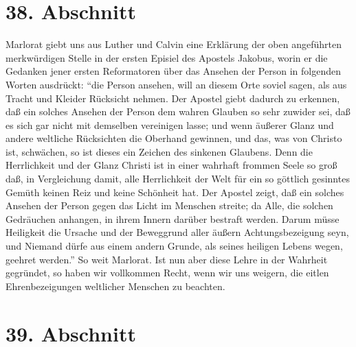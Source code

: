 \section{38. Abschnitt}

Marlorat giebt uns aus Luther und Calvin eine Erklärung der oben angeführten merkwürdigen Stelle in der ersten Episiel des Apostels Jakobus, worin er die Gedanken jener ersten Reformatoren über das Ansehen der Person in folgenden Worten ausdrückt: "`die Person ansehen, will an diesem Orte soviel sagen, als aus Tracht und Kleider Rücksicht nehmen. Der Apostel giebt dadurch zu erkennen, daß ein solches Ansehen der Person dem wahren Glauben so sehr zuwider sei, daß es sich gar nicht mit demselben vereinigen lasse; und wenn äußerer Glanz und andere weltliche Rücksichten die Oberhand gewinnen, und das, was von Christo ist, schwächen, so ist dieses ein Zeichen des sinkenen Glaubens. Denn die Herrlichkeit und der Glanz Christi ist in einer wahrhaft frommen Seele so groß daß, in Vergleichung damit, alle Herrlichkeit der Welt für ein so göttlich gesinntes Gemüth keinen Reiz und keine Schönheit hat. Der Apostel zeigt, daß ein solches Ansehen der Person gegen das Licht im Menschen streite; da Alle, die solchen Gedräuchen anhangen, in ihrem Innern darüber bestraft werden. Darum müsse Heiligkeit die Ursache und der Beweggrund aller äußern Achtungsbezeigung seyn, und Niemand dürfe aus einem andern Grunde, als seines heiligen Lebens wegen, geehret werden."' So weit Marlorat. Ist nun aber diese Lehre in der Wahrheit gegründet, so haben wir vollkommen Recht, wenn wir uns weigern, die eitlen Ehrenbezeigungen weltlicher Menschen zu beachten.

\section{39. Abschnitt}

